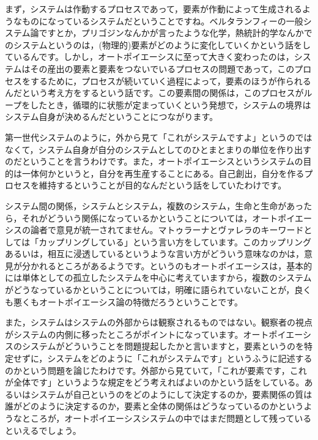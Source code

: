 \documentclass{ltjsbook}
\begin{document}
まず，システムは作動するプロセスであって，要素が作動によって生成されるようなものになっているシステムだということですね。ベルタランフィーの一般システム論ですとか，プリゴジンなんかが言ったような化学，熱統計的学なんかでのシステムというのは，(物理的)要素がどのように変化していくかという話をしているんです。しかし，オートポイエーシスに至って大きく変わったのは，システムはその産出の要素と要素をつないでいるプロセスの問題であって，このプロセスをするために，プロセスが続いていく過程によって，要素のほうが作られるんだという考え方をするという話です。この要素間の関係は，このプロセスがループをしたとき，循環的に状態が定まっていくという発想で，システムの境界はシステム自身が決めるんだということにつながります。

第一世代システムのように，外から見て「これがシステムですよ」というのではなくて，システム自身が自分のシステムとしてのひとまとまりの単位を作り出すのだということを言うわけです。また，オートポイエーシスというシステムの目的は一体何かというと，自分を再生産することにある。自己創出，自分を作るプロセスを維持するということが目的なんだという話をしていたわけです。

システム間の関係，システムとシステム，複数のシステム，生命と生命があったら，それがどういう関係になっているかということについては，オートポイエーシスの論者で意見が統一されてません。マトゥラーナとヴァレラのキーワードとしては「カップリングしている」という言い方をしています。このカップリングあるいは，相互に浸透しているというような言い方がどういう意味なのかは，意見が分かれるところがあるようです。というのもオートポイエーシスは，基本的には単体としての孤立したシステムを中心に考えていますから，複数のシステムがどうなっているかということについては，明確に語られていないことが，良くも悪くもオートポイエーシス論の特徴だろうということです。

また，システムはシステムの外部からは観察されるものではない。観察者の視点がシステムの内側に移ったところがポイントになっています。オートポイエーシスのシステムがどういうことを問題提起したかと言いますと，要素というのを特定せずに，システムをどのように「これがシステムです」というふうに記述するのかという問題を論じたわけです。外部から見ていて，「これが要素です，これが全体です」というような規定をどう考えればよいのかという話をしている。あるいはシステムが自己というのをどのようにして決定するのか，要素関係の質は誰がどのように決定するのか，要素と全体の関係はどうなっているのかというようなところが，オートポイエーシスシステムの中ではまだ問題として残っているといえるでしょう。
\end{document}
